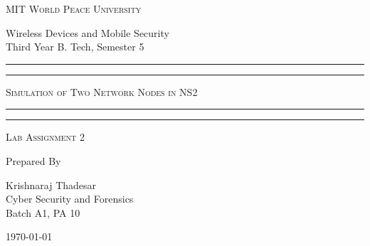 \documentclass[11pt]{article}
\begin{document}
\begin{titlepage}
    \centering


    \huge\textsc{
        MIT World Peace University
    }\\

    \vspace{0.75\baselineskip} %

    \LARGE{
        Wireless Devices and Mobile Security\\
        Third Year B. Tech, Semester 5
    }

    \vfill %


    \rule{\textwidth}{1.6pt}\vspace*{-\baselineskip}\vspace*{2pt}
    \rule{\textwidth}{0.6pt}
    \vspace{0.75\baselineskip} %



    \huge{\textsc{
            Simulation of Two Network Nodes in NS2
        }} \\



    \vspace{0.5\baselineskip} %
    \rule{\textwidth}{0.6pt}\vspace*{-\baselineskip}\vspace*{2.8pt}
    \rule{\textwidth}{1.6pt}

    \vspace{1\baselineskip} %


    \LARGE\textsc{
        Lab Assignment 2
    } %
    \vfill


    Prepared By
    \vspace{0.5\baselineskip} %

    \Large{
        Krishnaraj Thadesar \\
        Cyber Security and Forensics\\
        Batch A1, PA 10
    }


    \vspace{0.5\baselineskip} %
    \today

\end{titlepage}
\end{document}
